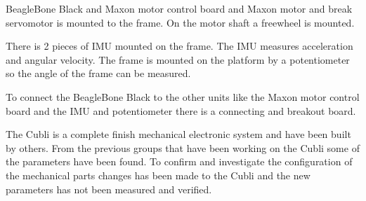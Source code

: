 BeagleBone Black and Maxon motor control board and Maxon motor and break servomotor is mounted to the frame. On the motor shaft a freewheel is mounted. 

There is 2 pieces of IMU mounted on the frame. The IMU measures acceleration and angular velocity. The frame is mounted on the platform by a potentiometer so the angle of the frame can be measured.

To connect the BeagleBone Black to the other units like the Maxon motor control board and the IMU and potentiometer there is a connecting and breakout board.

The Cubli is a complete finish mechanical electronic system and have been built by others. From the previous groups that have been working on the Cubli some of the parameters have been found. To confirm and investigate the configuration of the mechanical parts changes has been made to the Cubli and the new parameters has not been measured and verified.

